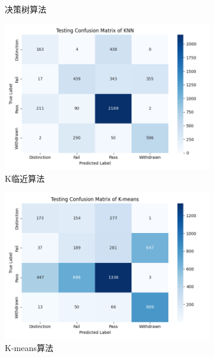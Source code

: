 \documentclass[a4paper, utf8]{ctexart}
\begin{document}
\begin{figure}
\begin{subfigure}{.32\textwidth}
			\caption{决策树算法}
		\end{subfigure}
		
		\begin{subfigure}{.32\textwidth}
			\centering
			\includegraphics[width=\textwidth]{./figure/test_knn.png}
			\caption{K临近算法}
		\end{subfigure}
		\begin{subfigure}{.32\textwidth}
			\centering
			\includegraphics[width=\textwidth]{./figure/test_kmeans.png}
			\caption{K-means算法}
		\end{subfigure}
		\begin{subfigure}{.32\textwidth}
			\centering

\end{subfigure}
\end{figure}
\end{document}
